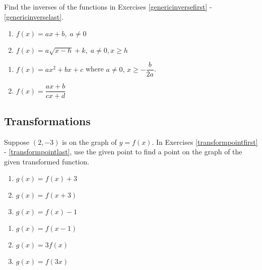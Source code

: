Find the inverses of the functions in Exercises \ref{genericinversefirst} - \ref{genericinverselast}.

\begin{multicols}{2}
\begin{enumerate}
\setcounter{enumi}{\value{HW}}

\item $f(x) = ax + b, \; a \neq 0$ \label{genericinversefirst}
\item $f(x) = a\sqrt{x - h} + k, \; a \neq 0, x \geq h$


\setcounter{HW}{\value{enumi}}
\end{enumerate}
\end{multicols}

\begin{multicols}{2}
\begin{enumerate}
\setcounter{enumi}{\value{HW}}
\item $f(x) = ax^{2} + bx + c$ where $a \neq 0, \, x \geq -\dfrac{b}{2a}$.

\item $f(x) = \dfrac{ax + b}{cx + d}\;$ \label{genericinverselast}

\setcounter{HW}{\value{enumi}}
\end{enumerate}
\end{multicols}

\newpage
\subsection{Transformations}

Suppose $(2,-3)$ is on the graph of $y = f(x)$.  In Exercises \ref{transformpointfirst} - \ref{transformpointlast}, use the given point to %
find a point on the graph of the given transformed function.

\begin{multicols}{3}
\begin{enumerate}

\item $g(x) = f(x)+3$ \label{transformpointfirst}
\item $g(x) = f(x+3)$
\item $g(x) = f(x)-1$

\setcounter{HW}{\value{enumi}}
\end{enumerate}
\end{multicols}

\begin{multicols}{3}
\begin{enumerate}
\setcounter{enumi}{\value{HW}}

\item $g(x) = f(x-1)$
\item $g(x) = 3f(x)$
\item $g(x) = f(3x)$

\setcounter{HW}{\value{enumi}}
\end{enumerate}
\end{multicols}

